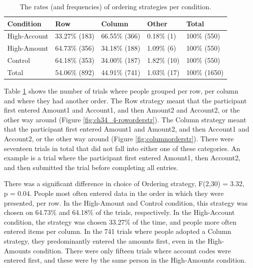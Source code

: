 \begin{table}[!ht]
\centering
\begin{tabular}{|l|l|l|l|l|}
\cline{1-5}
Condition    & Row           & Column      & Other       & Total      \\ \hline
High-Account & 33.27\% {\footnotesize (183)} & 66.55\% {\footnotesize (366)} & 0.18\% {\footnotesize(1)}  & 100\% {\footnotesize (550)}  \\ \hline
High-Amount  & 64.73\% {\footnotesize (356)} & 34.18\% {\footnotesize (188)} & 1.09\% {\footnotesize(6)}  & 100\% {\footnotesize (550)}  \\ \hline
Control      & 64.18\% {\footnotesize (353)} & 34.00\% {\footnotesize (187)} & 1.82\% {\footnotesize(10)}  & 100\% {\footnotesize (550)}  \\ \hline
Total        & 54.06\% {\footnotesize (892)} & 44.91\% {\footnotesize (741)} & 1.03\% {\footnotesize(17)} & 100\% {\footnotesize (1650)} \\ \hline
\end{tabular}
\caption{The rates (and frequencies) of ordering strategies per condition.}\label{table:ch34_4-str-order}
\end{table}

Table \ref{table:ch34_4-str-order} shows the number of trials where people grouped per row, per column and where they had another order. The Row strategy meant that the participant first entered Amount1 and Account1, and then Amount2 and Account2, or the other way around (Figure \ref{fig:ch34_4-roworderstr}). The Column strategy meant that the participant first entered Amount1 and Amount2, and then Account1 and Account2, or the other way around (Figure \ref{fig:columnorderstr}). There were seventeen trials in total that did not fall into either one of these categories. An example is a trial where the participant first entered Amount1, then Account2, and then submitted the trial before completing all entries.

There was a significant difference in choice of Ordering strategy, F(2,30) = 3.32, p = 0.04. People most often entered data in the order in which they were presented, per row. In the High-Amount and Control condition, this strategy was chosen on 64.73\% and 64.18\% of the trials, respectively. In the High-Account condition, the strategy was chosen 33.27\% of the time, and people more often entered items per column. In the 741 trials where people adopted a Column strategy, they predominantly entered the amounts first, even in the High-Amounts condition. There were only fifteen trials where account codes were entered first, and these were by the same person in the High-Amounts condition.

